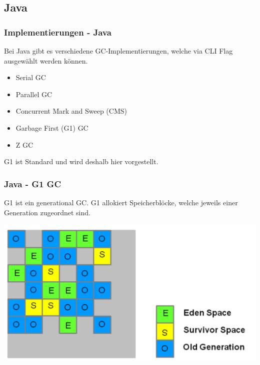 \documentclass{beamer}
\begin{document}
        \subsection{Java}
            \begin{frame}
                \frametitle{Implementierungen - Java}

                Bei Java gibt es verschiedene GC-Implementierungen, welche via CLI Flag ausgewählt werden können.
                \begin{itemize}
                    \item Serial GC
                    \item Parallel GC
                    \item Concurrent Mark and Sweep (CMS)
                    \item Garbage First (G1) GC
                    \item Z GC
                \end{itemize}
                G1 ist Standard und wird deshalb hier vorgestellt.
            \end{frame}

            \begin{frame}
                \frametitle{Java - G1 GC}

                G1 ist ein generational GC.
                G1 allokiert Speicherblöcke, welche jeweils einer Generation zugeordnet sind.

                \includegraphics[width=\textwidth]{images/G1MemoryRegions.png}

            \end{frame}
\end{document}
